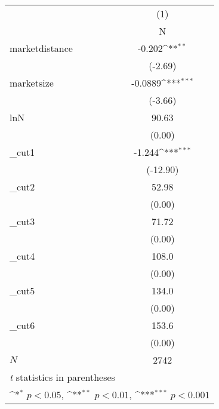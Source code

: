 {
\def\sym#1{\ifmmode^{#1}\else\(^{#1}\)\fi}
\begin{tabular}{l*{1}{c}}
\hline\hline
            &\multicolumn{1}{c}{(1)}\\
            &\multicolumn{1}{c}{N}\\
\hline
marketdistance&      -0.202\sym{**} \\
            &     (-2.69)         \\
[1em]
marketsize  &     -0.0889\sym{***}\\
            &     (-3.66)         \\
[1em]
lnN         &       90.63         \\
            &      (0.00)         \\
[1em]
\_cut1       &      -1.244\sym{***}\\
            &    (-12.90)         \\
[1em]
\_cut2       &       52.98         \\
            &      (0.00)         \\
[1em]
\_cut3       &       71.72         \\
            &      (0.00)         \\
[1em]
\_cut4       &       108.0         \\
            &      (0.00)         \\
[1em]
\_cut5       &       134.0         \\
            &      (0.00)         \\
[1em]
\_cut6       &       153.6         \\
            &      (0.00)         \\
\hline
\(N\)       &        2742         \\
\hline\hline
\multicolumn{2}{l}{\footnotesize \textit{t} statistics in parentheses}\\
\multicolumn{2}{l}{\footnotesize \sym{*} \(p<0.05\), \sym{**} \(p<0.01\), \sym{***} \(p<0.001\)}\\
\end{tabular}
}
